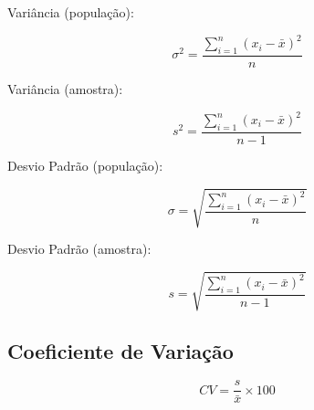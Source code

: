 Variância (população):

\[ \sigma^2=\frac{\sum_{i=1}^{n} (x_i - \bar{x})^2}{n} \]

Variância (amostra):

\[ s^2=\frac{\sum_{i=1}^{n} (x_i - \bar{x})^2}{n-1} \]

Desvio Padrão (população):

\[ \sigma=\sqrt{\frac{\sum_{i=1}^{n} (x_i - \bar{x})^2}{n}} \]

Desvio Padrão (amostra):

\[ s=\sqrt{\frac{\sum_{i=1}^{n} (x_i - \bar{x})^2}{n-1}} \]

\subsection{Coeficiente de Variação}

\[ CV=\frac{s}{\bar{x}} \times 100 \]
